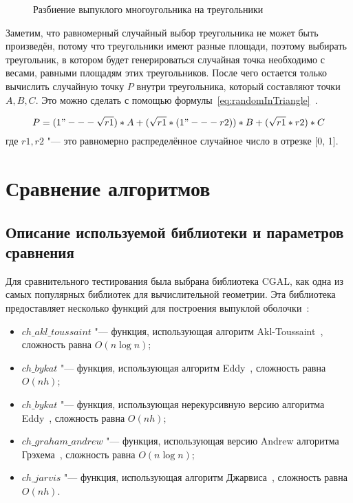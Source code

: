 \begin{figure}
	\centering
	
	\caption{Разбиение выпуклого многоугольника на треугольники}
	\label{img:triangles}
\end{figure}

Заметим, что равномерный случайный выбор треугольника не может быть произведён, потому что треугольники имеют разные площади, поэтому выбирать треугольник, в котором будет генерироваться случайная точка необходимо с весами, равными площадям этих треугольников. После чего остается только вычислить случайную точку $P$ внутри треугольника, который составляют точки $A, B, C$. Это можно сделать с помощью формулы~\eqref{eq:randomInTriangle}~\cite{osada2002shape}.

\begin{equation}\label{eq:randomInTriangle}
P = (1 "--- \sqrt{r1}) * A + (\sqrt{r1} * (1 "--- r2)) * B + (\sqrt{r1} * r2) * C
\end{equation}
где $r1, r2$ "--- это равномерно распределённое случайное число в отрезке [0, 1].

\section{Сравнение алгоритмов}

\subsection{Описание используемой библиотеки и параметров сравнения}

Для сравнительного тестирования была выбрана библиотека CGAL, как одна из самых популярных библиотек для вычислительной геометрии. Эта библиотека предоставляет несколько функций для построения выпуклой оболочки~\cite{cgalconvexhull}:
\begin{itemize}
	\item $ch\_akl\_toussaint$ "--- функция, использующая алгоритм Akl-Toussaint~\cite{akl1978fast}, сложность равна $O(n \log n)$;
	\item $ch\_bykat$ "--- функция, использующая алгоритм Eddy~\cite{eddy1977new}, сложность равна $O(nh)$;
	\item $ch\_bykat$ "--- функция, использующая нерекурсивную версию алгоритма Eddy~\cite{bykat1978convex}, сложность равна $O(nh)$;
	\item $ch\_graham\_andrew$ "--- функция, использующая версию Andrew алгоритма Грэхема~\cite{andrew1979another}, сложность равна $O(n \log n)$;
	\item $ch\_jarvis$ "--- функция, использующая алгоритм Джарвиса~\cite{jarvis1973Jarvis}, сложность равна $O(nh)$.
\end{itemize}

